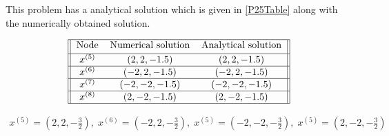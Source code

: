 This problem has a analytical solution which is given in \eqref{P25Table} along with the numerically obtained solution.

\begin{gather}    
\label{P25Table}
\begin{tabular}{||c c c||} 
 \hline
 Node & Numerical solution & Analytical solution \\ [0.5ex] 
 \hline
$x^{(5)}$ & $(2,2,-1.5)$ & $(2,2,-1.5)$  \\ 
 \hline
 $x^{(6)}$ & $(-2,2,-1.5)$& $(-2,2,-1.5)$  \\ 
 \hline
 $x^{(7)}$ & $(-2,-2,-1.5)$ & $(-2,-2,-1.5)$\\ 
 \hline
 $x^{(8)}$ & $(2,-2,-1.5)$ & $(2,-2,-1.5)$ \\ 
 \hline
\end{tabular}
\end{gather}

\begin{equation*}
    \begin{gathered}
    x^{(5)} = (2,2,-\frac{3}{2}),\;x^{(6)} = (-2,2,-\frac{3}{2}),\;x^{(5)} = (-2,-2,-\frac{3}{2}),\;x^{(5)} = (2,-2,-\frac{3}{2})
    \end{gathered}
\end{equation*}


